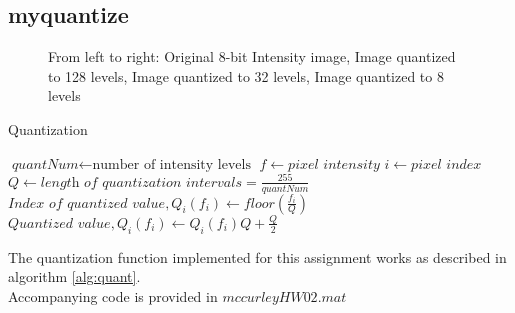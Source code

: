 \documentclass{article}[12 pt]
\begin{document}
\newpage
\subsection*{myquantize}
\begin{figure}[h!]
\captionsetup[subfloat]{labelformat=empty}
\centering
{}
\hspace{0mm}
\hspace{0mm}
\caption{From left to right: Original 8-bit Intensity image, Image quantized to 128 levels, Image quantized to 32 levels, Image quantized to 8 levels}
\end{figure}




\begin{algorithm}[H]
\caption{Quantization}\label{alg:quant}
\begin{algorithmic}[1]
\State $\textit{quantNum} \gets \text{number of intensity levels}$
\State $f \gets \textit{pixel intensity}$
\State $i \gets \textit{pixel index}$
\State $\textit{Q} \gets \textit{length of quantization intervals} = \frac{255}{quantNum}$
\State $\textit{Index of quantized value}, Q_i(f_i) \gets \textit{floor}(\frac{f_i}{Q})$
\State $\textit{Quantized value}, Q_i(f_i) \gets Q_i(f_i)Q+\frac{Q}{2}$
\EndFor
\EndProcedure
{}
\end{algorithmic}
\end{algorithm}
\vspace{5mm}
\noindent
The quantization function implemented for this assignment works as described in algorithm \ref{alg:quant}. \\
 \vspace{10mm}
 \noindent Accompanying code is provided in $mccurleyHW02.mat$
\end{document}
